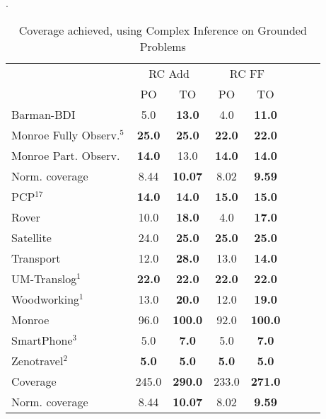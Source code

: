 \begin{table}
	\centering
	\caption{Coverage achieved, using Complex Inference on Grounded Problems}
	\label{table:GroundedComplexCoverage}.
	\scalebox{0.8} {

\begin{tabular}{lccccccl}
	\toprule
	&  \multicolumn{2}{c}{RC Add} & \multicolumn{2}{c}{ RC FF} \\ %
	\cmidrule(lr){2-3} \cmidrule(lr){4-5}
	&PO & TO &PO & TO  \\
	\midrule
	Barman-BDI & 5.0 & \textbf{13.0} & 4.0 & \textbf{11.0}  \\
	Monroe Fully Observ.$^{5}$ & \textbf{25.0} & \textbf{25.0} & \textbf{22.0} & \textbf{22.0}  \\
	Monroe Part. Observ. & \textbf{14.0} & 13.0 & \textbf{14.0} & \textbf{14.0}  \\
	Norm. coverage & 8.44 & \textbf{10.07} & 8.02 & \textbf{9.59}  \\
	PCP$^{17}$ & \textbf{14.0} & \textbf{14.0} & \textbf{15.0} & \textbf{15.0}  \\
	Rover & 10.0 & \textbf{18.0} & 4.0 & \textbf{17.0}  \\
	Satellite & 24.0 & \textbf{25.0} & \textbf{25.0} & \textbf{25.0}  \\
	Transport & 12.0 & \textbf{28.0} & 13.0 & \textbf{14.0}  \\
	UM-Translog$^{1}$ & \textbf{22.0} & \textbf{22.0} & \textbf{22.0} & \textbf{22.0}  \\
	Woodworking$^{1}$ & 13.0 & \textbf{20.0} & 12.0 & \textbf{19.0}  \\

	\midrule
	Monroe & 96.0 & \textbf{100.0} & 92.0 & \textbf{100.0}  \\
	SmartPhone$^{3}$ & 5.0 & \textbf{7.0} & 5.0 & \textbf{7.0}  \\
	Zenotravel$^{2}$ & \textbf{5.0} & \textbf{5.0} & \textbf{5.0} & \textbf{5.0}  \\

		\midrule
	Coverage & 245.0 & \textbf{290.0} & 233.0 & \textbf{271.0}  \\
	Norm. coverage & 8.44 & \textbf{10.07} & 8.02 & \textbf{9.59}  \\
	\bottomrule
\end{tabular}
	}
\end{table}


